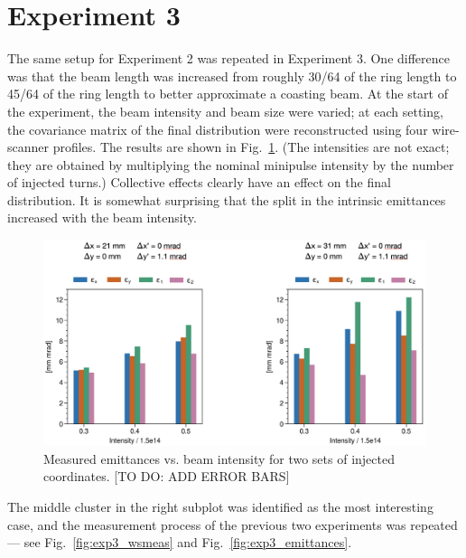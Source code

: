 \section{Experiment 3}

The same setup for Experiment 2 was repeated in Experiment 3. One difference was that the beam length was increased from roughly 30/64 of the ring length to 45/64 of the ring length to better approximate a coasting beam. At the start of the experiment, the beam intensity and beam size were varied; at each setting, the covariance matrix of the final distribution were reconstructed using four wire-scanner profiles. The results are shown in Fig.~\ref{fig:exp3_search}. (The intensities are not exact; they are obtained by multiplying the nominal minipulse intensity by the number of injected turns.) Collective effects clearly have an effect on the final distribution. It is somewhat surprising that the split in the intrinsic emittances increased with the beam intensity. 
%
\begin{figure}[!p]
    \centering
    \vspace*{1.0cm}
    \includegraphics[width=\textwidth]{Images/chapter5/exp3/search.png}
    \caption{Measured emittances vs. beam intensity for two sets of injected coordinates. [TO DO: ADD ERROR BARS]}
    \label{fig:exp3_search}
    \vspace*{1.0cm}
\end{figure}
%
The middle cluster in the right subplot was identified as the most interesting case, and the measurement process of the previous two experiments was repeated — see Fig.~\ref{fig:exp3_wsmeas} and Fig.~\ref{fig:exp3_emittances}.
%
